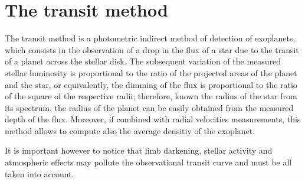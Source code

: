 \documentclass[a4paper,11pt,twocolumn]{article}
\begin{document}




\section{The transit method }

The transit method is a photometric indirect method of detection of exoplanets, which consists in the observation of a drop in the flux of a star due to the transit of a planet across the stellar disk. 
The subsequent variation of the measured stellar luminosity is proportional to the ratio of the projected areas of the planet and the star, or equivalently, the dimming of the flux is proportional to the ratio of the square of the respective radii; therefore, known the radius of the star from its spectrum, the radius of the planet can be easily obtained from the measured depth of the flux.
Moreover, if combined with radial velocities measurements, this method allows to compute also the average densitiy of the exoplanet.

It is important however to notice that limb darkening, stellar activity and atmospheric effects may pollute the observational transit curve and must be all taken into account.
\end{document}
